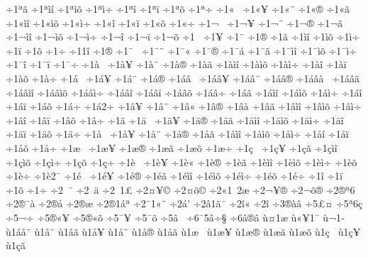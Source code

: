 {^^f71^^aa^^e3
^^f71^^aa^^ec^^ee
^^f71^^aa^^ec^^f5
^^f71^^aa^^ec^^f7
^^f71^^aa^^ee
^^f71^^aa^^ef
^^f71^^aa^^f5
^^f71^^aa^^f7
^^f71^^ab^^a0
^^f71^^ab^^a5
^^f71^^ab^^a8
^^f71^^ab^^ae
^^f71^^ab^^e3
^^f71^^ab^^ec^^ee
^^f71^^ab^^ec^^f5
^^f71^^ab^^ec^^f7
^^f71^^ab^^ee
^^f71^^ab^^ef
^^f71^^ab^^f5
^^f71^^ab^^f7
^^f71^^ac^^a0
^^f71^^ac^^a5
^^f71^^ac^^a8
^^f71^^ac^^ae
^^f71^^ac^^e3
^^f71^^ac^^ec^^ee
^^f71^^ac^^ec^^f5
^^f71^^ac^^ec^^f7
^^f71^^ac^^ee
^^f71^^ac^^ef
^^f71^^ac^^f5
^^f71^^ad^^a0
^^f71^^ad^^a5
^^f71^^ad^^a8
^^f71^^ad^^ae
^^f71^^ad^^e3
^^f71^^ad^^ec^^ee
^^f71^^ad^^ec^^f5
^^f71^^ad^^ec^^f7
^^f71^^ad^^ef
^^f71^^ad^^f5
^^f71^^ad^^f7
^^f71^^ad1^^ee
^^f71^^ae
^^f71^^af^^a0
^^f71^^af^^a8
^^f71^^af^^ab
^^f71^^af^^ae
^^f71^^af^^e1
^^f71^^af^^e3
^^f71^^af^^ec^^ee
^^f71^^af^^ec^^f5
^^f71^^af^^ec^^f7
^^f71^^af^^ee
^^f71^^af^^ef
^^f71^^af^^f7
^^f71^^e0^^a0
^^f71^^e0^^a5
^^f71^^e0^^a8
^^f71^^e0^^ae
^^f71^^e0^^e3
^^f71^^e0^^ec^^ee
^^f71^^e0^^ec^^f5
^^f71^^e0^^ec^^f7
^^f71^^e0^^ee
^^f71^^e0^^ef
^^f71^^e0^^f5
^^f71^^e0^^f7
^^f71^^e1^^a0
^^f71^^e1^^a5
^^f71^^e1^^a8
^^f71^^e1^^ae
^^f71^^e1^^e2^^a0
^^f71^^e1^^e2^^a5
^^f71^^e1^^e2^^a8
^^f71^^e1^^e2^^ae
^^f71^^e1^^e2^^e0^^a0
^^f71^^e1^^e2^^e3
^^f71^^e1^^e2^^ec^^ee
^^f71^^e1^^e2^^ec^^f5
^^f71^^e1^^e2^^ec^^f7
^^f71^^e1^^e2^^ee
^^f71^^e1^^e2^^ef
^^f71^^e1^^e2^^f5
^^f71^^e1^^e2^^f7
^^f71^^e1^^e3
^^f71^^e1^^ec^^ee
^^f71^^e1^^ec^^f5
^^f71^^e1^^ec^^f7
^^f71^^e1^^ee
^^f71^^e1^^ef
^^f71^^e1^^f5
^^f71^^e1^^f7
^^f71^^e12^^ad^^f7
^^f71^^e2^^a5
^^f71^^e2^^a8
^^f71^^e2^^ab
^^f71^^e2^^ae
^^f71^^e2^^e0
^^f71^^e2^^e3
^^f71^^e2^^ec^^ee
^^f71^^e2^^ec^^f5
^^f71^^e2^^ec^^f7
^^f71^^e2^^ee
^^f71^^e2^^ef
^^f71^^e2^^f5
^^f71^^e2^^f7
^^f71^^e3
^^f71^^e4^^a0
^^f71^^e4^^a5
^^f71^^e4^^ae
^^f71^^e4^^e3
^^f71^^e4^^ec^^ee
^^f71^^e4^^ec^^f5
^^f71^^e4^^ec^^f7
^^f71^^e4^^ee
^^f71^^e4^^ef
^^f71^^e4^^f5
^^f71^^e4^^f7
^^f71^^e5^^a0
^^f71^^e5^^a5
^^f71^^e5^^a8
^^f71^^e5^^ae
^^f71^^e5^^e3
^^f71^^e5^^ec^^ee
^^f71^^e5^^ec^^f5
^^f71^^e5^^ec^^f7
^^f71^^e5^^ee
^^f71^^e5^^ef
^^f71^^e5^^f5
^^f71^^e5^^f7
^^f71^^e6^^a0
^^f71^^e6^^a5
^^f71^^e6^^ae
^^f71^^e6^^e3
^^f71^^e6^^f5
^^f71^^e6^^f7
^^f71^^e7^^a0
^^f71^^e7^^a5
^^f71^^e7^^e3
^^f71^^e7^^ec^^ee
^^f71^^e7^^ec^^f5
^^f71^^e7^^ec^^f7
^^f71^^e7^^f5
^^f71^^e7^^f7
^^f71^^e8^^a0
^^f71^^e8^^a5
^^f71^^e8^^ab
^^f71^^e8^^ae
^^f71^^e8^^e3
^^f71^^e8^^ec^^ee
^^f71^^e8^^ec^^f5
^^f71^^e8^^ec^^f7
^^f71^^e8^^f5
^^f71^^e8^^f7
^^f71^^e82^^af
^^f71^^e9^^a0
^^f71^^e9^^a5
^^f71^^e9^^ae
^^f71^^e9^^e3
^^f71^^e9^^ec^^ee
^^f71^^e9^^ec^^f5
^^f71^^e9^^ec^^f7
^^f71^^e9^^f5
^^f71^^e9^^f7
^^f71^^ee
^^f71^^ef
^^f71^^f5
^^f71^^f7
^^f72^^a0^^af
^^f72^^a0^^e4
^^f72^^a01^^a3
^^f72^^a4^^a5^^a9
^^f72^^a4^^f5^^a9
^^f72^^ab1^^a02^^e6
^^f72^^ac^^a5^^ad^^ae
^^f72^^ac^^f5^^ad^^ae
^^f72^^ae^^aa6
^^f72^^ae^^af^^e0
^^f72^^ae^^e5
^^f72^^ae^^e6
^^f72^^ae1^^e1^^aa
^^f72^^af1^^ab^^a8
^^f72^^e1'
^^f72^^e21^^e3^^af
^^f72^^ee^^ab
^^f72^^ee^^ad
^^f73^^ae^^e0^^e2
^^f75^^a3^^a4
^^f75^^aa6^^e7
^^f75^^ac^^f7
^^f75^^ae^^ab^^a5
^^f75^^ae^^ab^^f5
^^f75^^af^^a5
^^f75^^af^^f5
^^f75^^e2^^a0
^^f76^^af5^^e2^^f7^^a7
^^f76^^e2^^ae^^e2
^^f9^^a41^^e6
^^f9^^ab^^a51^^af
^^f9^^ac1^^ad
^^f91^^e1^^e2^^a8
^^f91^^e2^^a8
^^f91^^e2^^e3
^^f91^^e5^^a5
^^f91^^e5^^a8
^^f91^^e5^^ae
^^f91^^e5^^e3
^^f91^^e6^^a0
^^f91^^e6^^a5
^^f91^^e6^^ae
^^f91^^e6^^e3
^^f91^^e6^^f5
^^f91^^e7^^a0
^^f91^^e7^^a5
^^f91^^e7^^e3
}

